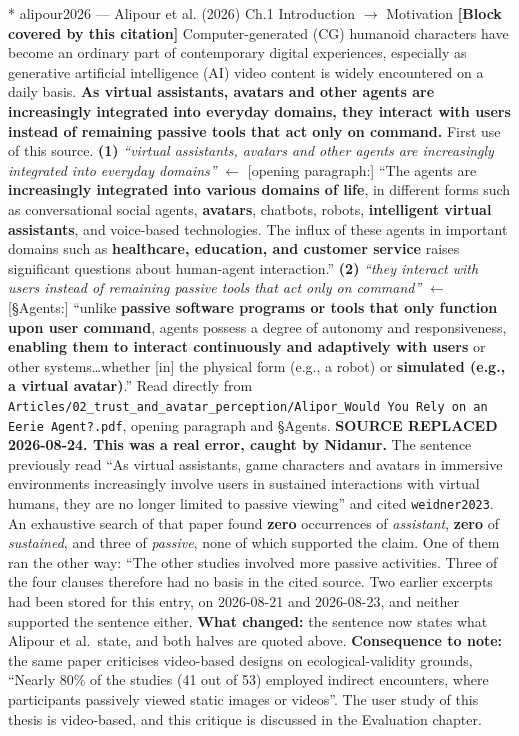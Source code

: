 \documentclass[11pt, a4paper]{article}
\makeatletter
\newcounter{citentry}
\newcommand{\citentry@core}[7]{%
  \stepcounter{citentry}
  \begingroup
  \sbox{\citentry@measurebox}{%
    \begin{minipage}{\linewidth}
      \noindent\colorbox{konstanzblue}{\parbox{\dimexpr\linewidth-2\fboxsep}{%
        \vspace{3pt}
        \textbf{\#\thecitentry \quad #2} \hfill \textit{#3}
        \vspace{3pt}
      }}
      \vspace{3pt}
      \noindent\begin{tabular}{@{}p{2.7cm} p{\dimexpr\linewidth-3cm}@{}}
        \textit{\small Sentence in thesis:} & #4 \\[5pt]
        \textbf{Usage:}\hfill       & #5 \\[5pt]
        \textit{\small Original source:}     & #6 \\[5pt]
        \textbf{How to check:}             & #7 \\
      \end{tabular}
      \vspace{5pt}
      \rule{10pt}{10pt}\quad \textbf{Validated} --- I have read the original and agree it supports the sentence.
    \end{minipage}%
  }%
  \Needspace{\dimexpr\ht\citentry@measurebox+\dp\citentry@measurebox\relax}%
  \endgroup
  \vspace{10pt}
  \noindent\colorbox{konstanzblue}{\parbox{\dimexpr\linewidth-2\fboxsep}{%
    \vspace{3pt}
    \textcolor{white}{\textbf{\#\thecitentry \quad #2}} \hfill \textcolor{white}{\textit{#3}}
    \vspace{3pt}
  }}
  \vspace{3pt}
  \noindent\begin{tabular}{@{}p{2.7cm} p{\dimexpr\linewidth-3cm}@{}}
    \textit{\small Sentence in thesis:} & \textcolor{darkgreen}{#4} \\[5pt]
    \textbf{Usage:}\hfill       & #5 \\[5pt]
    \textit{\small Original source:}     & \textcolor{darkred}{#6} \\[5pt]
    \textbf{How to check:}             & #7 \\
  \end{tabular}
  \vspace{5pt}
  \noindent\CheckBox[name=verified\thecitentry, width=10pt, height=10pt, bordercolor={0 0 0}, borderwidth=0.75, backgroundcolor={1 1 1}#1]{}\quad \textbf{Validated} --- I have read the original and agree it supports the sentence.
  \vspace{3pt}
  \noindent\textcolor{midgray}{\rule{\linewidth}{0.4pt}}
}
\newcommand{\citentry}{\@ifstar{\citentry@core{, checked}}{\citentry@core{}}}
\makeatother
\begin{document}
\begin{Form}
\citentry*
  {alipour2026 --- Alipour et al. (2026)}
  {Ch.1 Introduction $\rightarrow$ Motivation}
  {\textbf{[Block covered by this citation]} Computer-generated (CG) humanoid characters have become an ordinary part of contemporary digital experiences, especially as generative artificial intelligence (AI) video content is widely encountered on a daily basis. \textbf{As virtual assistants, avatars and other agents are increasingly integrated into everyday domains, they interact with users instead of remaining passive tools that act only on command.}}
  {First use of this source.}
  {\textbf{(1)} \emph{``virtual assistants, avatars and other agents are increasingly integrated into everyday domains''} $\leftarrow$ [opening paragraph:] ``The agents are \textbf{increasingly integrated into various domains of life}, in different forms such as conversational social agents, \textbf{avatars}, chatbots, robots, \textbf{intelligent virtual assistants}, and voice-based technologies. The influx of these agents in important domains such as \textbf{healthcare, education, and customer service} raises significant questions about human-agent interaction.'' \quad \textbf{(2)} \emph{``they interact with users instead of remaining passive tools that act only on command''} $\leftarrow$ [\S Agents:] ``unlike \textbf{passive software programs or tools that only function upon user command}, agents possess a degree of autonomy and responsiveness, \textbf{enabling them to interact continuously and adaptively with users} or other systems\ldots whether [in] the physical form (e.g., a robot) or \textbf{simulated (e.g., a virtual avatar)}.''}
  {Read directly from \texttt{\footnotesize Articles/02\_trust\_and\_avatar\_perception/Alipor\_Would You Rely on an Eerie Agent?.pdf}, opening paragraph and \S Agents. \textbf{SOURCE REPLACED 2026-08-24. This was a real error, caught by Nidanur.} The sentence previously read ``As virtual assistants, game characters and avatars in immersive environments increasingly involve users in sustained interactions with virtual humans, they are no longer limited to passive viewing'' and cited \texttt{weidner2023}. An exhaustive search of that paper found \textbf{zero} occurrences of \emph{assistant}, \textbf{zero} of \emph{sustained}, and three of \emph{passive}, none of which supported the claim. One of them ran the other way: ``The other studies involved more passive activities. Three of the four clauses therefore had no basis in the cited source. Two earlier excerpts had been stored for this entry, on 2026-08-21 and 2026-08-23, and neither supported the sentence either. \textbf{What changed:} the sentence now states what Alipour et al.\ state, and both halves are quoted above. \textbf{Consequence to note:} the same paper criticises video-based designs on ecological-validity grounds, ``Nearly 80\% of the studies (41 out of 53) employed indirect encounters, where participants passively viewed static images or videos''. The user study of this thesis is video-based, and this critique is discussed in the Evaluation chapter.}


\end{Form}
\end{document}
